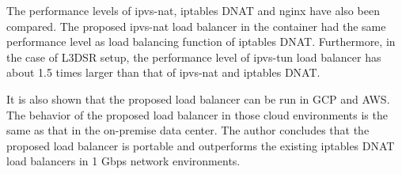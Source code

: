 The performance levels of ipvs-nat, iptables DNAT and nginx have also been compared.
The proposed ipvs-nat load balancer in the container had the same performance level as load balancing function of iptables DNAT.
Furthermore, in the case of L3DSR setup, the performance level of ipvs-tun load balancer has about 1.5 times larger than that of ipvs-nat and iptables DNAT.

It is also shown that the proposed load balancer can be run in GCP and AWS.
The behavior of the proposed load balancer in those cloud environments is the same as that in the on-premise data center.
The author concludes that the proposed load balancer is portable and outperforms the existing iptables DNAT load balancers in 1 Gbps network environments.
